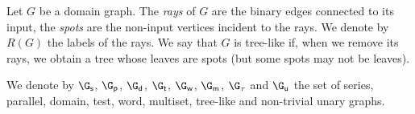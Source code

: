 \begin{definition}
Let $G$ be a domain graph. The \emph{rays} of $G$ are the binary edges connected to its input, the \emph{spots} are the non-input vertices incident to the rays. We denote by $R(G)$ the labels of the rays. We say that $G$ is tree-like if, when we remove its rays, we obtain a tree whose leaves are spots  (but some spots may not be leaves).   
\end{definition}
We denote by $\G_\mathsf{s}$, $\G_\mathsf{p}$, $\G_\mathsf{d}$, $\G_\mathsf{t}$, $\G_\mathsf{w}$, $\G_\mathsf{m}$, $\G_\mathsf{\tau}$ and  $\G_\mathsf{u}$ the set of series, parallel, domain, test, word, multiset, tree-like and non-trivial unary graphs.  
